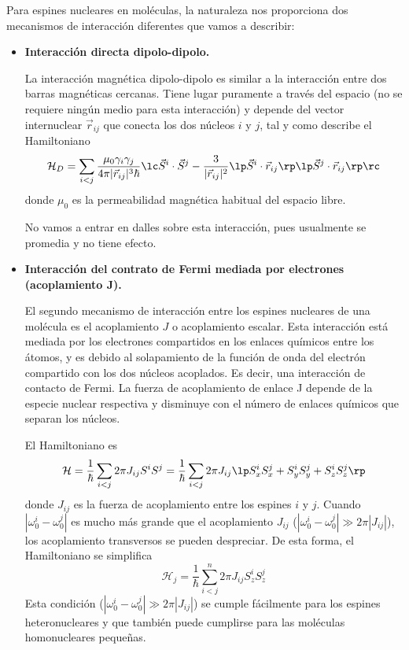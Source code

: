 
Para espines nucleares en moléculas, la naturaleza nos proporciona dos mecanismos de interacción diferentes que vamos a describir: 
\begin{itemize}
	\item \textbf{Interacción directa dipolo-dipolo.}
	
La interacción magnética dipolo-dipolo es similar a la interacción entre dos barras magnéticas cercanas. Tiene lugar puramente a través del espacio (no se requiere ningún medio para esta interacción) y depende del vector internuclear $\vec{r}_{ij}$ que conecta los dos núcleos $i$ y $j$, tal y como describe el Hamiltoniano
	\begin{equation} \label{ec_Hardware_NMR_H_dipolo-dipolo}
	\mathcal{H}_D = \sum_{i<j} \frac{\mu_0 \gamma_i \gamma_j}{4 \pi | \vec{r}_{ij}|^3 \hbar} 
	\lc \vec{S}^i \cdot \vec{S}^j - \frac{3}{| \vec{r}_{ij}|^2} \lp \vec{S}^i \cdot \vec{r}_{ij} \rp \lp \vec{S}^j \cdot \vec{r}_{ij} \rp \rc
	\end{equation}
donde $\mu_0$ es la permeabilidad magnética habitual del espacio libre. 

No vamos a entrar en dalles sobre esta interacción, pues usualmente se promedia y no tiene efecto.
	
	\item \textbf{Interacción del contrato de Fermi mediada por electrones (acoplamiento J).}

	El segundo mecanismo de interacción entre los espines nucleares de una molécula es el acoplamiento $J$ o acoplamiento escalar. Esta interacción está mediada por los electrones compartidos en los enlaces químicos entre los átomos, y es debido al solapamiento de la función de onda del electrón compartido con los dos núcleos acoplados. Es decir, una interacción de contacto de Fermi. La fuerza de acoplamiento de enlace J depende de la especie nuclear respectiva y disminuye con el número de enlaces químicos que separan los núcleos.

El Hamiltoniano es
	\begin{equation}
	\mathcal{H} = \frac{1}{\hbar} \sum_{i <j} 2 \pi J_{ij} S^i S^j = 
	\frac{1}{\hbar} \sum_{i < j} 2 \pi J_{ij} \lp S_x^i S_x^j + S_y^i S_y^j + S_z^i S_z^j  \rp
	\end{equation}
donde $J_{ij}$ es la fuerza de acoplamiento entre los espines $i$ y $j$. Cuando $| \omega_0^i - \omega_0^j |$ es mucho más grande que el acoplamiento $J_{ij}$ ($| \omega_0^i - \omega_0^j | \gg 2 \pi |J_{ij}|$), los acoplamiento transversos se pueden despreciar. De esta forma, el Hamiltoniano se simplifica
	\begin{equation} \label{ec_Hardware_NMR_J_coupling}
	\boxed{\mathcal{H}_j = \frac{1}{\hbar} \sum_{i < j}^n 2 \pi J_{ij} S_z^{i} S_z^{j}}
	\end{equation}
Esta condición ($| \omega_0^i - \omega_0^j | \gg 2 \pi |J_{ij}|$) se cumple fácilmente para los espines heteronucleares y que también puede cumplirse para las moléculas homonucleares pequeñas.


\end{itemize}
